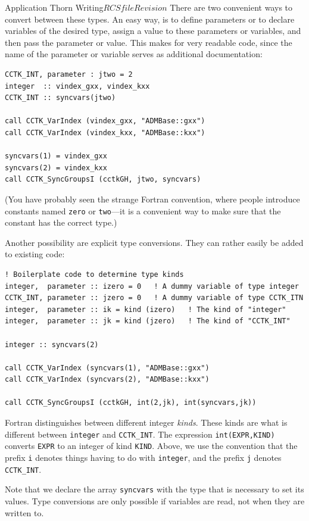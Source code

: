 \begin{cactuspart}{Application Thorn Writing}{$RCSfile$}{$Revision$}
There are two convenient ways to convert between these types.  An easy
way, is to define parameters or to declare variables of the desired
type, assign a value to these parameters or variables, and then pass
the parameter or value.  This makes for very readable code, since the
name of the parameter or variable serves as additional documentation:

\begin{verbatim}
CCTK_INT, parameter : jtwo = 2
integer  :: vindex_gxx, vindex_kxx
CCTK_INT :: syncvars(jtwo)

call CCTK_VarIndex (vindex_gxx, "ADMBase::gxx")
call CCTK_VarIndex (vindex_kxx, "ADMBase::kxx")

syncvars(1) = vindex_gxx
syncvars(2) = vindex_kxx
call CCTK_SyncGroupsI (cctkGH, jtwo, syncvars)
\end{verbatim}

(You have probably seen the strange Fortran convention, where people
introduce constants named \texttt{zero} or \texttt{two}---it is a convenient way to make sure that the
constant has the correct type.)

Another possibility are explicit type conversions.  They can rather
easily be added to existing code:

\begin{verbatim}
! Boilerplate code to determine type kinds
integer,  parameter :: izero = 0   ! A dummy variable of type integer
CCTK_INT, parameter :: jzero = 0   ! A dummy variable of type CCTK_ITN
integer,  parameter :: ik = kind (izero)   ! The kind of "integer"
integer,  parameter :: jk = kind (jzero)   ! The kind of "CCTK_INT"

integer :: syncvars(2)

call CCTK_VarIndex (syncvars(1), "ADMBase::gxx")
call CCTK_VarIndex (syncvars(2), "ADMBase::kxx")

call CCTK_SyncGroupsI (cctkGH, int(2,jk), int(syncvars,jk))
\end{verbatim}

Fortran distinguishes between different integer \emph{kinds}.  These
kinds are what is different between \texttt{integer} and
\texttt{CCTK\_INT}.  The expression \texttt{int(EXPR,KIND)} converts
\texttt{EXPR} to an integer of kind \texttt{KIND}.  Above, we use the
convention that the prefix \texttt{i} denotes things having to do with
\texttt{integer}, and the prefix \texttt{j} denotes
\texttt{CCTK\_INT}.

Note that we declare the array \texttt{syncvars} with the type that is
necessary to set its values.  Type conversions are only possible if
variables are read, not when they are written to.



\end{cactuspart}
